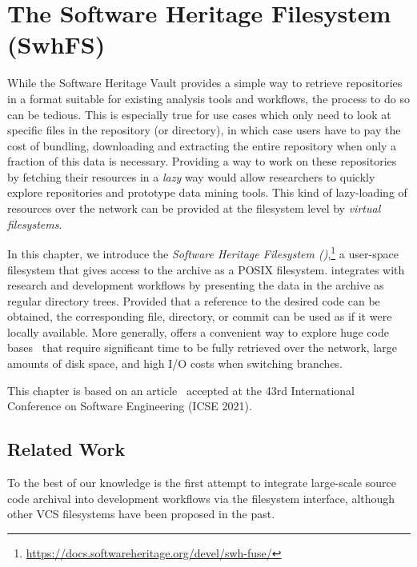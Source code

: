 \chapter{The Software Heritage Filesystem (SwhFS)}
\label{chp:fuse}

While the Software Heritage Vault provides a simple way to retrieve
repositories in a format suitable for existing analysis tools and workflows,
the process to do so can be tedious. This is especially true for use cases
which only need to look at specific files in the repository (or directory), in
which case users have to pay the cost of bundling, downloading and extracting
the entire repository when only a fraction of this data is necessary. Providing
a way to work on these repositories by fetching their resources in a
\emph{lazy} way would allow researchers to quickly explore repositories and
prototype data mining tools. This kind of lazy-loading of resources over the
network can be provided at the filesystem level by \emph{virtual filesystems}.

In this chapter, we introduce the \emph{Software Heritage Filesystem
  (\SWHFS)},\footnote{\url{https://docs.softwareheritage.org/devel/swh-fuse/}}
  a user-space filesystem that gives access to the \SWH{} archive as a POSIX
  filesystem. \SWHFS{} integrates with research and development workflows by
presenting the data in the archive as regular directory trees.
Provided that a reference to the desired code can be obtained, the
corresponding file, directory, or commit can be used as if it were locally
available. More generally, \SWHFS{} offers a convenient way to explore huge
code bases~\cite{msscalar, msvfsforgit} that require significant time to be
fully retrieved over the network, large amounts of disk space, and high I/O
costs when switching branches.

\vspace{0.5cm}

This chapter is based on an article~\cite{swh-2021-swhfs}
accepted at the 43rd International Conference on Software Engineering (ICSE
2021).



\section{Related Work}

To the best of our knowledge \SWHFS{} is the first attempt to integrate
large-scale source code archival into development workflows via the filesystem
interface, although other VCS filesystems have been proposed in the past.

